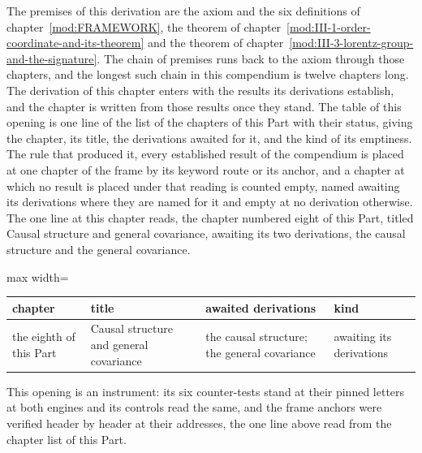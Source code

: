 \begin{chproof}[instrument]
The premises of this derivation are the axiom and the six definitions of chapter~\ref{mod:FRAMEWORK}, the theorem of chapter~\ref{mod:III-1-order-coordinate-and-its-theorem} and the theorem of chapter~\ref{mod:III-3-lorentz-group-and-the-signature}. The chain of premises runs back to the axiom through those chapters, and the longest such chain in this compendium is twelve chapters long.
The derivation of this chapter enters with the results its derivations establish, and the chapter is written from those results once they stand.
The table of this opening is one line of the list of the chapters of this Part with their status, giving the chapter, its title, the derivations awaited for it, and the kind of its emptiness. The rule that produced it, every established result of the compendium is placed at one chapter of the frame by its keyword route or its anchor, and a chapter at which no result is placed under that reading is counted empty, named awaiting its derivations where they are named for it and empty at no derivation otherwise. The one line at this chapter reads, the chapter numbered eight of this Part, titled Causal structure and general covariance, awaiting its two derivations, the causal structure and the general covariance.
\begin{center}\begin{adjustbox}{max width=\linewidth}\begin{tabular}{llll}\hline chapter & title & awaited derivations & kind \\ \hline the eighth of this Part & Causal structure and general covariance & the causal structure; the general covariance & awaiting its derivations \\ \hline \end{tabular}\end{adjustbox}\end{center}
This opening is an instrument: its six counter-tests stand at their pinned letters at both engines and its controls read the same, and the frame anchors were verified header by header at their addresses, the one line above read from the chapter list of this Part.
\end{chproof}

